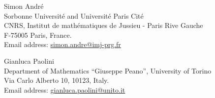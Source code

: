 \documentclass[a4paper, 11pt]{amsart}
\theoremstyle{definition}
\theoremstyle{remark}
\begin{document}


\renewcommand{\refname}{Bibliography}



\vspace{2cm}

\setlength{\parindent}{0pt}
Simon Andr{\' e}
\\
Sorbonne Universit{\' e} and Universit{\' e} Paris Cit{\' e}
\\
CNRS, Institut de mathématiques de Jussieu - Paris Rive Gauche
\\
F-75005 Paris, France.
\\
Email address: \href{mailto:simon.andre@imj-prg.fr}{simon.andre@imj-prg.fr}

\bigskip

Gianluca Paolini
\\
Department of Mathematics ``Giuseppe Peano'', University of Torino
\\
Via Carlo Alberto 10, 10123, Italy.
\\
Email address: \href{mailto:gianluca.paolini@unito.it}{gianluca.paolini@unito.it}
\end{document}
